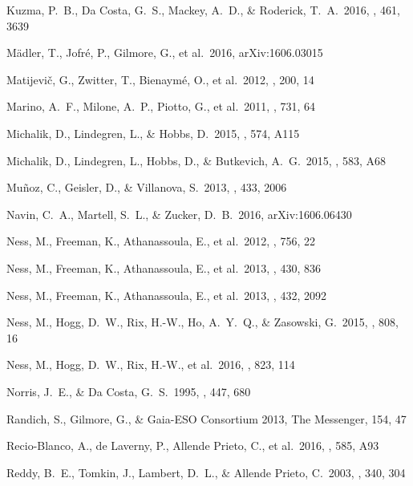 \documentclass[preprint,trackchanges]{aastex}
\begin{document}
\begin{thebibliography}{dummy}
 Kuzma, P.~B., Da Costa, G.~S., Mackey, A.~D., \& Roderick, T.~A.\ 2016, \mnras, 461, 3639 

 M{\"a}dler, T., Jofr{\'e}, P., Gilmore, G., et al.\ 2016, arXiv:1606.03015 

 Matijevi{\v c}, G., Zwitter, T., Bienaym{\'e}, O., et al.\ 2012, \apjs, 200, 14 

 Marino, A.~F., Milone, A.~P., Piotto, G., et al.\ 2011, \apj, 731, 64 

 Michalik, D., Lindegren, L., \& Hobbs, D.\ 2015, \aap, 574, A115 

 Michalik, D., Lindegren, L., Hobbs, D., \& Butkevich, A.~G.\ 2015, \aap, 583, A68 

 Mu{\~n}oz, C., Geisler, D., \& Villanova, S.\ 2013, \mnras, 433, 2006 

 Navin, C.~A., Martell, S.~L., \& Zucker, D.~B.\ 2016, arXiv:1606.06430 

 Ness, M., Freeman, K., Athanassoula, E., et al.\ 2012, \apj, 756, 22 

 Ness, M., Freeman, K., Athanassoula, E., et al.\ 2013, \mnras, 430, 836 

 Ness, M., Freeman, K., Athanassoula, E., et al.\ 2013, \mnras, 432, 2092 

 Ness, M., Hogg, D.~W., Rix, H.-W., Ho, A.~Y.~Q., \& Zasowski, G.\ 2015, \apj, 808, 16 

 Ness, M., Hogg, D.~W., Rix, H.-W., et al.\ 2016, \apj, 823, 114 

 Norris, J.~E., \& Da Costa, G.~S.\ 1995, \apj, 447, 680 

 Randich, S., Gilmore, G., \& Gaia-ESO Consortium 2013, The Messenger, 154, 47 

 Recio-Blanco, A., de Laverny, P., Allende Prieto, C., et al.\ 2016, \aap, 585, A93 

 Reddy, B.~E., Tomkin, J., Lambert, D.~L., \& Allende Prieto, C.\ 2003, \mnras, 340, 304 


\end{thebibliography}
\end{document}

